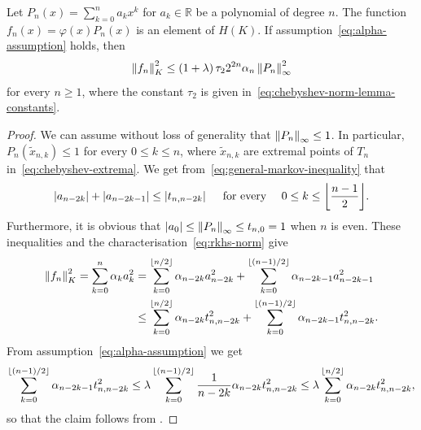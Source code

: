 \documentclass{mcom-l}
\numberwithin{equation}{section}
\numberwithin{theorem}{section} %
\DeclarePairedDelimiter{\floor}{\lfloor}{\rfloor}         %
\newcommand{\R}{\mathbb{R}} %
\begin{document}
\begin{lemma}
  \label{lemma:unif-norm-bound}
  Let $P_n(x) = \sum_{k=0}^n a_k x^k$ for $a_k \in \R$ be a polynomial of degree $n$.
  The function $f_n(x) = \varphi(x) P_n(x)$ is an element of $H(K)$.
  If assumption~\eqref{eq:alpha-assumption} holds, then
  \begin{equation*}
    \norm[0]{f_n}_K^2 \leq (1 + \lambda) \, \tau_2 2^{2n} \alpha_n \norm[0]{P_n}_\infty^2
  \end{equation*}
  for every $n \geq 1$, where the constant $\tau_2$ is given in~\eqref{eq:chebyshev-norm-lemma-constants}.
\end{lemma}
\begin{proof}
  We can assume without loss of generality that $\norm[0]{P_n}_\infty \leq 1$.
  In particular, $P_n(\tilde{x}_{n,k}) \leq 1$ for every $0 \leq k \leq n$, where $\tilde{x}_{n,k}$ are extremal points of $T_n$ in~\eqref{eq:chebyshev-extrema}.
  We get from~\eqref{eq:general-markov-inequality} that
  \begin{equation*}
    \abs[0]{a_{n-2k}} + \abs[0]{a_{n-2k-1}} \leq \abs[0]{t_{n,n-2k}} \quad \text{ for every } \quad 0 \leq k \leq \floor[\bigg]{\frac{n-1}{2}}.
  \end{equation*}
  Furthermore, it is obvious that $\abs[0]{a_0} \leq \norm[0]{P_n}_\infty \leq t_{n, 0} = 1$ when $n$ is even.
  These inequalities and the characterisation~\eqref{eq:rkhs-norm} give
  \begin{equation*}
    \begin{split}
      \norm[0]{f_n}_K^2 = \sum_{k=0}^n \alpha_k a_k^2 &= \sum_{k=0}^{\floor{n/2}} \alpha_{n - 2k} a_{n - 2k}^2 + \sum_{k=0}^{\floor{(n-1)/2}} \alpha_{n - 2k -1} a_{n - 2k - 1}^2 \\
      &\leq \sum_{k=0}^{\floor{n/2}} \alpha_{n - 2k} t_{n, n - 2k}^2 + \sum_{k=0}^{\floor{(n-1)/2}} \alpha_{n - 2k -1} t_{n, n - 2k}^2.
      \end{split}
  \end{equation*}
  From assumption~\eqref{eq:alpha-assumption} we get
  \begin{equation*}
      \sum_{k=0}^{\floor{(n-1)/2}} \alpha_{n - 2k -1} t_{n, n - 2k}^2 \leq \lambda \sum_{k=0}^{\floor{(n-1)/2}} \frac{1}{n-2k} \alpha_{n - 2k} t_{n, n - 2k}^2 \leq \lambda \sum_{k=0}^{\floor{n/2}} \alpha_{n - 2k} t_{n, n - 2k}^2,
  \end{equation*}
  so that the claim follows from .
\end{proof}
\end{document}
